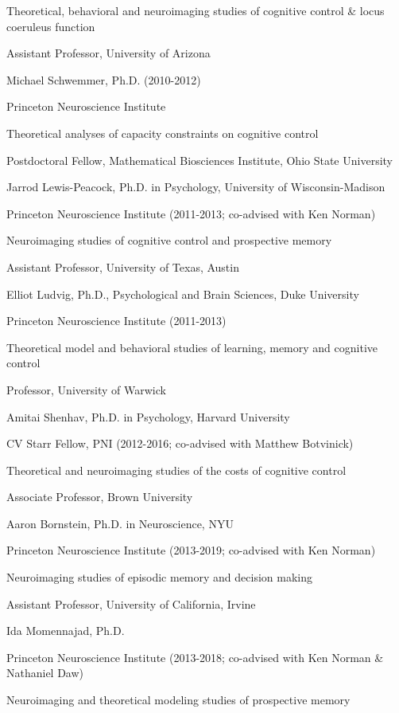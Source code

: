 \documentclass[10 pt]{article}
\begin{document}
Theoretical, behavioral and neuroimaging studies of cognitive control \& locus coeruleus function

Assistant Professor, University of Arizona
    \medskip

Michael Schwemmer, Ph.D. (2010-2012)

Princeton Neuroscience Institute

Theoretical analyses of capacity constraints on cognitive control

Postdoctoral Fellow, Mathematical Biosciences Institute, Ohio State University
    \medskip

Jarrod Lewis-Peacock, Ph.D. in Psychology, University of Wisconsin-Madison

Princeton Neuroscience Institute (2011-2013; co-advised with Ken Norman)

Neuroimaging studies of cognitive control and prospective memory

Assistant Professor, University of Texas, Austin
    \medskip

Elliot Ludvig, Ph.D., Psychological and Brain Sciences, Duke University

Princeton Neuroscience Institute (2011-2013)

Theoretical model and behavioral studies of learning, memory and cognitive control

Professor, University of Warwick
    \medskip

Amitai Shenhav, Ph.D. in Psychology, Harvard University

CV Starr Fellow, PNI (2012-2016; co-advised with Matthew Botvinick)

Theoretical and neuroimaging studies of the costs of cognitive control

Associate Professor, Brown University
    \medskip

Aaron Bornstein, Ph.D. in Neuroscience, NYU

Princeton Neuroscience Institute (2013-2019; co-advised with Ken Norman)

Neuroimaging studies of episodic memory and decision making

Assistant Professor, University of California, Irvine
    \medskip

Ida Momennajad, Ph.D.

Princeton Neuroscience Institute (2013-2018; co-advised with Ken Norman \& Nathaniel Daw)

Neuroimaging and theoretical modeling studies of prospective memory
    \medskip
\end{document}
